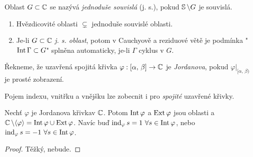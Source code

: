 \begin{definition}
Oblast $G\subset \operatorname{\mathbb{C}}$ se nazývá \emph{jednoduše souvislá} (j. s.), pokud $\operatorname{\mathbb{S}}\setminus G$ je souvislá.
\end{definition}

\begin{note}
\begin{enumerate}\mbox{}
    \item 
        Hvězdicovité oblasti $\subsetneq$ jednoduše souvislé oblasti.
    \item
        Je-li $G\subset\operatorname{\mathbb{C}}$ \emph{j. s. oblast}, potom v Cauchyově a reziduové větě je podmínka "$\operatorname{Int}\Gamma\subset G$" splněna automaticky, je-li $\Gamma$ cyklus v $G$.
\end{enumerate}
\end{note}

\begin{definition}
Řekneme, že uzavřená spojitá křivka $\varphi:[\alpha,\, \beta]\rightarrow\operatorname{\mathbb{C}}$ je \emph{Jordanova}, pokud $\varphi\big\rvert_{[\alpha,\, \beta)}$ je prosté zobrazení.
\end{definition}

\begin{note}
Pojem indexu, vnitřku a vnějšku lze zobecnit i pro \emph{spojité} uzavřené křivky.
\end{note}

\begin{theorem}[Jordanova]\label{thm:Jordan}
Nechť $\varphi$ je Jordanova křivkav $\operatorname{\mathbb{C}}$. Potom $\operatorname{Int}\varphi$ a $\operatorname{Ext}\varphi$ jsou oblasti a $\operatorname{\mathbb{C}}\setminus\langle\varphi\rangle=\operatorname{Int}\varphi\cup\operatorname{Ext}\varphi$. Navíc buď $\operatorname{ind}_\varphi s=1\ \forall s \in \operatorname{Int}\varphi$, nebo $\ind_\varphi s=-1\ \forall s \in \Int\varphi$.
\end{theorem}
\begin{proof}
Těžký, nebude.
\end{proof}